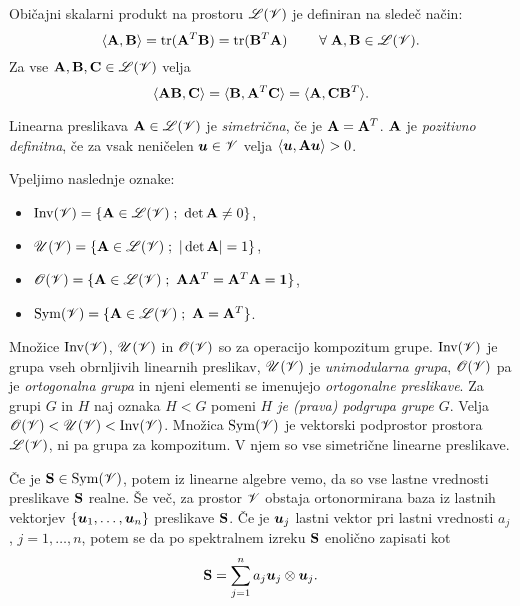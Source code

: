 Običajni skalarni produkt na prostoru $\mathscr L(\mathscr V)$ je definiran na sledeč način:
\begin{equation*} %
	\langle\ten{A},\ten{B}\rangle=\tr(\ten{A}^T\ten{B})=\tr(\ten{B}^T\ten{A})
	\qquad\;\forall\;\ten{A},\ten{B}\in\L(\V).
\end{equation*}
Za vse $\mathbf A,\mathbf B,\mathbf C\in\mathscr L(\mathscr V)$ velja
\begin{equation} \label{e:skatra}
	\langle\mathbf A\mathbf B,\mathbf C\rangle=\langle\mathbf B,\mathbf A^{T}\mathbf C\rangle
	=\langle\mathbf A,\mathbf C\mathbf B^{T}\rangle.
\end{equation}

Linearna preslikava $\mathbf A\in\mathscr L(\mathscr V)$ je \emph{simetrična}, če je $\mathbf A=\mathbf A^T$.
$\mathbf A$ je \emph{pozitivno definitna}, če za vsak neničelen $\boldsymbol u\in\mathscr V$ velja
$\langle\boldsymbol u,\mathbf A\boldsymbol u\rangle >0$.

Vpeljimo naslednje oznake:
\begin{itemize}[noitemsep]
	\item $\mathrm{Inv}(\mathscr V)=\{\mathbf A\in\mathscr L(\mathscr V)\;;\ \det\mathbf A\neq 0 \}$,
	\item $\mathscr{U}(\mathscr V)=\{\mathbf A\in\mathscr L(\mathscr V)\;;\ |\det\mathbf A|=1 \}$,
	\item $\mathscr{O}(\mathscr V)=\{\mathbf A\in\mathscr L(\mathscr V)\;;\ \mathbf A\mathbf A^T=\mathbf A^T\mathbf A=\mathbf 1 \}$,
	\item $\mathrm{Sym}(\mathscr V)=\{\mathbf A\in\mathscr L(\mathscr V)\;;\ \mathbf A=\mathbf A^T \}$.
\end{itemize}
Množice $\mathrm{Inv}(\mathscr V)$, $\mathscr{U}(\mathscr V)$ in $\mathscr{O}(\mathscr V)$ so za operacijo kompozitum
grupe. $\mathrm{Inv}(\mathscr V)$ je grupa vseh obrnljivih linearnih preslikav, $\mathscr{U}(\mathscr V)$
je \emph{unimodularna grupa}, $\mathscr{O}(\mathscr V)$ pa je \emph{ortogonalna grupa} in njeni elementi
se imenujejo \emph{ortogonalne preslikave}. Za grupi $G$ in $H$ naj oznaka $H<G$ pomeni \textit{$H$
je (prava) podgrupa grupe $G$}. Velja $\mathscr{O}(\mathscr V)<\mathscr{U}(\mathscr V)<\mathrm{Inv}(\mathscr V)$.
Množica $\mathrm{Sym}(\mathscr V)$ je vektorski podprostor prostora $\mathscr L(\mathscr V)$, ni pa grupa za kompozitum.
V njem so vse simetrične linearne preslikave.

Če je $\mathbf S\in\mathrm{Sym}(\mathscr V)$, potem iz linearne algebre vemo, da so vse lastne
vrednosti preslikave $\mathbf S$ realne. Še več, za prostor $\mathscr V$ obstaja ortonormirana baza
iz lastnih vektorjev $\{\boldsymbol u_1,\dots,\boldsymbol u_n\}$ preslikave $\mathbf S$. Če je
$\boldsymbol u_j$ lastni vektor pri lastni vrednosti $a_j$, $j=1,\dots,n$, potem se da po spektralnem
izreku $\mathbf S$ enolično zapisati kot
\begin{equation} \label{e:spekraz}
	\mathbf S=\sum_{j=1}^n a_j\boldsymbol u_j\otimes\boldsymbol u_j.
\end{equation}

